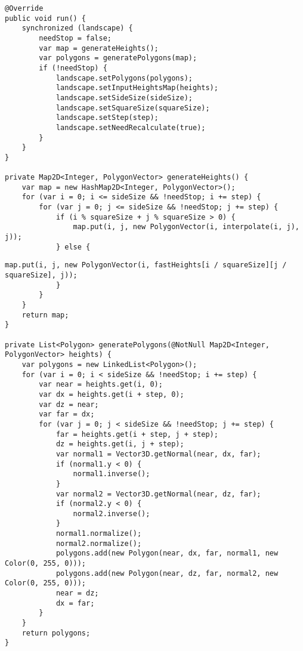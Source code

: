 \begin{lstlisting}[label=lst:gen1,caption=Реализация алгоритма генерации ландшафта (начало)]
@Override
public void run() {
	synchronized (landscape) {
		needStop = false;
		var map = generateHeights();
		var polygons = generatePolygons(map);
		if (!needStop) {
			landscape.setPolygons(polygons);
			landscape.setInputHeightsMap(heights);
			landscape.setSideSize(sideSize);
			landscape.setSquareSize(squareSize);
			landscape.setStep(step);
			landscape.setNeedRecalculate(true);
		}
	}
}

private Map2D<Integer, PolygonVector> generateHeights() {
	var map = new HashMap2D<Integer, PolygonVector>();
	for (var i = 0; i <= sideSize && !needStop; i += step) {
		for (var j = 0; j <= sideSize && !needStop; j += step) {
			if (i % squareSize + j % squareSize > 0) {
				map.put(i, j, new PolygonVector(i, interpolate(i, j), j));
			} else {
\end{lstlisting}
\begin{lstlisting}[label=lst:gen2,caption=Реализация алгоритма генерации ландшафта (продолжение)]
				map.put(i, j, new PolygonVector(i, fastHeights[i / squareSize][j / squareSize], j));
			}
		}
	}
	return map;
}

private List<Polygon> generatePolygons(@NotNull Map2D<Integer, PolygonVector> heights) {
	var polygons = new LinkedList<Polygon>();
	for (var i = 0; i < sideSize && !needStop; i += step) {
		var near = heights.get(i, 0);
		var dx = heights.get(i + step, 0);
		var dz = near;
		var far = dx;
		for (var j = 0; j < sideSize && !needStop; j += step) {
			far = heights.get(i + step, j + step);
			dz = heights.get(i, j + step);
			var normal1 = Vector3D.getNormal(near, dx, far);
			if (normal1.y < 0) {
				normal1.inverse();
			}
			var normal2 = Vector3D.getNormal(near, dz, far);
			if (normal2.y < 0) {
				normal2.inverse();
			}
			normal1.normalize();
			normal2.normalize();
			polygons.add(new Polygon(near, dx, far, normal1, new Color(0, 255, 0)));
			polygons.add(new Polygon(near, dz, far, normal2, new Color(0, 255, 0)));
			near = dz;
			dx = far;
		}
	}
	return polygons;
}
\end{lstlisting}
\clearpage

